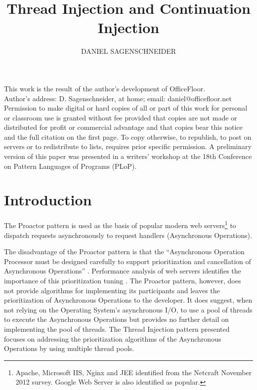 \documentclass[prodmode]{style/acmlarge}
\title{Thread Injection and Continuation Injection}
\author{DANIEL SAGENSCHNEIDER \affil{daniel@officefloor.net}}
\begin{document}
\begin{bottomstuff}
This work is the result of the author's development of OfficeFloor.\\
Author's address: D. Sagenschneider, at home; email: daniel@officefloor.net\\

Permission to make digital or hard copies of all or part of this work for
personal or classroom use is granted without fee provided that copies are not
made or distributed for profit or commercial advantage and that copies bear this
notice and the full citation on the first page. To copy otherwise, to republish,
to post on servers or to redistribute to lists, requires prior specific
permission. A preliminary version of this paper was presented in a writers'
workshop at the 18th Conference on Pattern Languages of Programs (PLoP).
\end{bottomstuff}

\maketitle

\section{Introduction}

The Proactor pattern \cite{proactor} is used as the basis of popular modern web
servers\footnote{Apache, Microsoft IIS, Nginx and JEE identified from the
Netcraft November 2012 survey.  Google Web Server is also identified as
popular.} to dispatch requests asynchronously to request handlers (Asynchronous
Operations).

The disadvantage of the Proactor pattern is that the ``Asynchronous Operation
Processor must be designed carefully to support prioritization and cancellation
of Asynchronous Operations'' \cite[p. 8]{proactor}.  Performance analysis of web
servers identifies the importance of this prioritization tuning
\cite{tuning-important,low-server-footprint,tuning-os-important}. The Proactor
pattern, however, does not provide algorithms for implementing its participants
and leaves the prioritization of Asynchronous Operations to the developer.  It
does suggest, when not relying on the Operating System's asynchronous I/O, to
use a pool of threads to execute the Asynchronous Operations but provides no
further detail on implementing the pool of threads.  The Thread Injection
pattern presented focuses on addressing the prioritization algorithms of the
Asynchronous Operations by using multiple thread pools.
\end{document}
